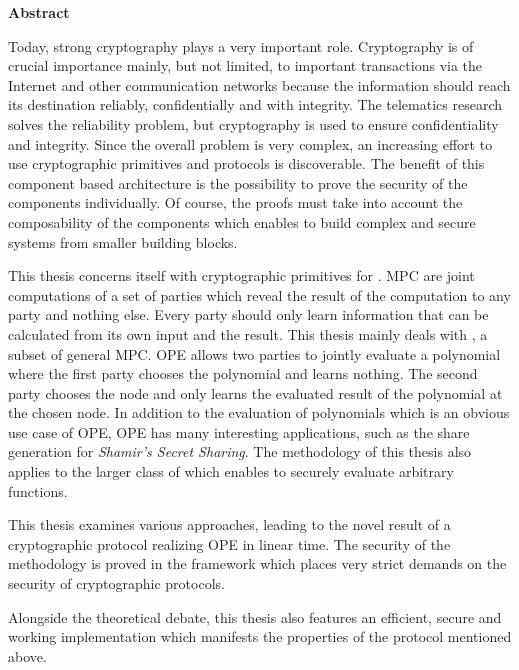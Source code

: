 \noindent{}\textsf{\textbf{\huge Abstract}}
%
\bigskip{}

\noindent{}Today, strong cryptography plays a very important role. Cryptography
is of crucial importance mainly, but not limited, to important transactions via
the Internet and other communication networks because the information should
reach its destination reliably, confidentially and with integrity. The
telematics research solves the reliability problem, but cryptography is used to
ensure confidentiality and integrity. Since the overall problem is very complex,
an increasing effort to use cryptographic primitives and protocols is
discoverable. The benefit of this component based architecture is the
possibility to prove the security of the components individually. Of course, the
proofs must take into account the composability of the components which enables
to build complex and secure systems from smaller building blocks.

This thesis concerns itself with cryptographic primitives for . MPC are joint computations of a set of parties
which reveal the result of the computation to any party and nothing else. Every
party should only learn information that can be calculated from its own input
and the result. This thesis mainly deals with , a subset of general MPC\@. OPE allows two parties to jointly
evaluate a polynomial where the first party chooses the polynomial and learns
nothing. The second party chooses the node and only learns the evaluated result
of the polynomial at the chosen node. In addition to the evaluation of
polynomials which is an obvious use case of OPE, OPE has many interesting
applications, such as the share generation for \emph{Shamir's Secret Sharing}.
The methodology of this thesis also applies to the larger class of
 which enables to securely evaluate
arbitrary functions.

This thesis examines various approaches, leading to the novel result of a
cryptographic protocol realizing OPE in linear time. The security of the
methodology is proved in the  framework
which places very strict demands on the security of cryptographic protocols.

Alongside the theoretical debate, this thesis also features an efficient, secure
and working implementation which manifests the properties of the protocol
mentioned above.

